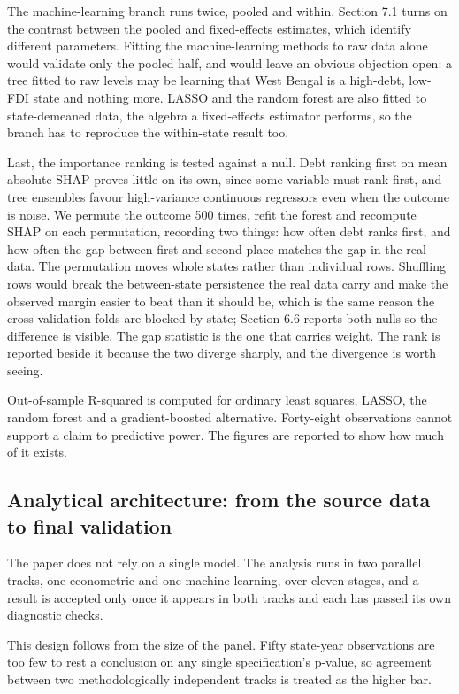 \documentclass[12pt,a4paper]{article}
\begin{document}
The machine-learning branch runs twice, pooled and within. Section 7.1 turns on the contrast between the pooled and fixed-effects estimates, which identify different parameters. Fitting the machine-learning methods to raw data alone would validate only the pooled half, and would leave an obvious objection open: a tree fitted to raw levels may be learning that West Bengal is a high-debt, low-FDI state and nothing more. LASSO and the random forest are also fitted to state-demeaned data, the algebra a fixed-effects estimator performs, so the branch has to reproduce the within-state result too.

Last, the importance ranking is tested against a null. Debt ranking first on mean absolute SHAP proves little on its own, since some variable must rank first, and tree ensembles favour high-variance continuous regressors even when the outcome is noise. We permute the outcome 500 times, refit the forest and recompute SHAP on each permutation, recording two things: how often debt ranks first, and how often the gap between first and second place matches the gap in the real data. The permutation moves whole states rather than individual rows. Shuffling rows would break the between-state persistence the real data carry and make the observed margin easier to beat than it should be, which is the same reason the cross-validation folds are blocked by state; Section 6.6 reports both nulls so the difference is visible. The gap statistic is the one that carries weight. The rank is reported beside it because the two diverge sharply, and the divergence is worth seeing.

Out-of-sample R-squared is computed for ordinary least squares, LASSO, the random forest and a gradient-boosted alternative. Forty-eight observations cannot support a claim to predictive power. The figures are reported to show how much of it exists.

\subsection{Analytical architecture: from the source data to final validation}

The paper does not rely on a single model. The analysis runs in two parallel tracks, one econometric and one machine-learning, over eleven stages, and a result is accepted only once it appears in both tracks and each has passed its own diagnostic checks.

This design follows from the size of the panel. Fifty state-year observations are too few to rest a conclusion on any single specification's p-value, so agreement between two methodologically independent tracks is treated as the higher bar.
\end{document}
